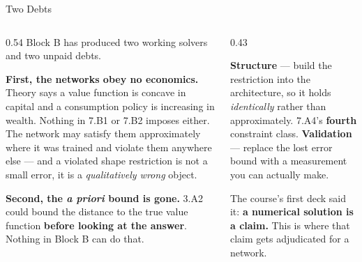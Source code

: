 \begin{frame}{Two Debts}
\begin{columns}[T]
\begin{column}{0.54\textwidth}
\small
Block B has produced two working solvers and two unpaid debts.
\medskip

\textbf{First, the networks obey no economics.} Theory says a value function is concave in capital and a consumption policy is increasing in wealth. Nothing in 7.B1 or 7.B2 imposes either. The network may satisfy them approximately where it was trained and violate them anywhere else --- and a violated shape restriction is not a small error, it is a \emph{qualitatively wrong} object.
\medskip

\textbf{Second, the \emph{a priori} bound is gone.} 3.A2 could bound the distance to the true value function \textbf{before looking at the answer}. Nothing in Block B can do that.
\end{column}
\begin{column}{0.43\textwidth}
\begin{conceptbox}[title=\textbf{This deck pays both}]\small
\textbf{Structure} --- build the restriction into the architecture, so it holds \emph{identically} rather than approximately. 7.A4's \textbf{fourth} constraint class.
\medskip
\textbf{Validation} --- replace the lost error bound with a measurement you can actually make.
\end{conceptbox}
\medskip
\begin{takeawaybox}\footnotesize
The course's first deck said it: \textbf{a numerical solution is a claim.} This is where that claim gets adjudicated for a network.
\end{takeawaybox}
\end{column}
\end{columns}
\end{frame}

